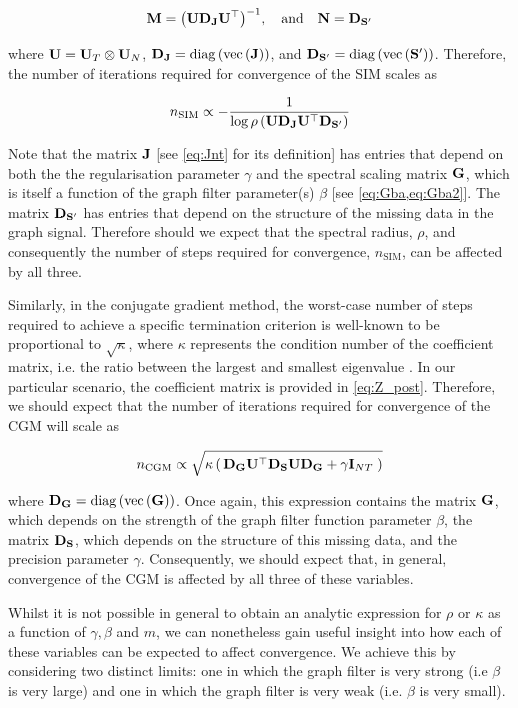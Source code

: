 $$
\mathbf{M} = \big(\mathbf{U} \mathbf{D}_{\mathbf{J}} \mathbf{U}^\top\big)^{-1}, \quad \text{and} \quad \mathbf{N} = \mathbf{D}_{\mathbf{S}'}
$$

where  $\mathbf{U} = \mathbf{U}_T \otimes \mathbf{U}_N$, $\mathbf{D}_{\mathbf{J}} = \text{\textup{diag}}\left(\text{\textup{vec}}\left(\mathbf{J}\right)\right)$, and $\mathbf{D}_{\mathbf{S}'} = \text{\textup{diag}}\left(\text{\textup{vec}}\left(\mathbf{S}'\right)\right)$. Therefore, the number of iterations required for convergence of the SIM scales as


\begin{equation}
    \label{eq:n_SIM}
    n_\text{SIM} \propto  -\frac{1}{\log\rho\left(\mathbf{U} \mathbf{D}_{\mathbf{J}} \mathbf{U}^\top \mathbf{D}_{\mathbf{S}'} \right)}
\end{equation}

Note that the matrix $\mathbf{J}$ [see \cref{eq:Jnt} for its definition] has entries that depend on both the the regularisation parameter $\gamma$ and the spectral scaling matrix $\mathbf{G}$, which is itself a function of the graph filter parameter(s) $\beta$ [see \cref{eq:Gba,eq:Gba2}]. The matrix $\mathbf{D}_{\mathbf{S}'}$ has entries that depend on the structure of the missing data in the graph signal. Therefore should we expect that the spectral radius, $\rho$, and consequently the number of steps required for convergence, $n_\text{SIM}$, can be affected by all three.  

Similarly, in the conjugate gradient method, the worst-case number of steps required to achieve a specific termination criterion is well-known to be proportional to $\sqrt{\kappa}$, where $\kappa$ represents the condition number of the coefficient matrix, i.e. the ratio between the largest and smallest eigenvalue \cite{Kelley1995}. In our particular scenario, the coefficient matrix is provided in \cref{eq:Z_post}. Therefore, we should expect that the number of iterations required for convergence of the CGM will scale as

\begin{equation}
    \label{eq:n_CGM}
     n_\text{CGM} \propto \sqrt{\kappa \left(  \, \mathbf{D}_{\mathbf{G}} \mathbf{U}^\top \mathbf{D}_{\mathbf{S}} \mathbf{U} \mathbf{D}_{\mathbf{G}} + \gamma \mathbf{I}_{NT} \; \right)}
\end{equation}

where $\mathbf{D}_{\mathbf{G}} = \text{\textup{diag}}\left(\text{\textup{vec}}\left(\mathbf{G}\right)\right)$. Once again, this expression contains the matrix $\mathbf{G}$, which depends on the strength of the graph filter function parameter $\beta$, the matrix $\mathbf{D}_{\mathbf{S}}$, which depends on the structure of this missing data, and the precision parameter $\gamma$. Consequently, we should expect that, in general, convergence of the CGM is affected by all three of these variables. 

Whilst it is not possible in general to obtain an analytic expression for $\rho$ or $\kappa$ as a function of $\gamma, \beta$ and $m$, we can nonetheless gain useful insight into how each of these variables can be expected to affect convergence. We achieve this by considering two distinct limits: one in which the graph filter is very strong (i.e $\beta$ is very large) and one in which the graph filter is very weak (i.e. $\beta$ is very small). 

